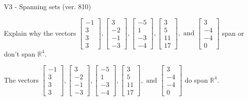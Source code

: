 \begin{exercise}
  \begin{exerciseTitle}V3 - Spanning sets (ver. 810)\end{exerciseTitle}
  \begin{exerciseStatement}
    Explain why the vectors \(\left[\begin{array}{r}
-1 \\
3 \\
3 \\
3
\end{array}\right] , \left[\begin{array}{r}
3 \\
-2 \\
-1 \\
-3
\end{array}\right] , \left[\begin{array}{r}
-5 \\
1 \\
-3 \\
-4
\end{array}\right] , \left[\begin{array}{r}
3 \\
5 \\
11 \\
17
\end{array}\right] , \text{ and } \left[\begin{array}{r}
3 \\
-4 \\
-4 \\
0
\end{array}\right]\) span or don't span \(\mathbb{R}^4\). 
	


  \end{exerciseStatement}
  \begin{exerciseAnswer}
   The vectors \(\left[\begin{array}{r}
-1 \\
3 \\
3 \\
3
\end{array}\right] , \left[\begin{array}{r}
3 \\
-2 \\
-1 \\
-3
\end{array}\right] , \left[\begin{array}{r}
-5 \\
1 \\
-3 \\
-4
\end{array}\right] , \left[\begin{array}{r}
3 \\
5 \\
11 \\
17
\end{array}\right] , \text{ and } \left[\begin{array}{r}
3 \\
-4 \\
-4 \\
0
\end{array}\right]\) 
  	 do  
	span \(\mathbb{R}^4\).
  



\end{exerciseAnswer}
\end{exercise}
